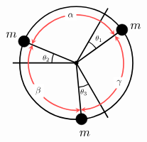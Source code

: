 \documentclass[10pt]{article}
\begin{document}
	$$\begin{tikzpicture}
            \draw[very thick] (0,0) circle (2cm);
            \filldraw[black] (0,0) circle (0.07cm);
            \foreach \position in {(1.618,1.176), (-1.848,0.765), (.185,-1.991)} {
                \filldraw[black] \position circle (0.2cm);
                \draw[very thick] (0,0) -- \position;
            }
            \foreach \position in {(2.1,1.3), (-2.3,1), (0.3,-2.5)} {
                \node[scale=1.25] at \position {$m$};
            }
            \foreach \position in {(1.12,1.94), (-2.25,0), (1.12,-1.94)} {
                \draw[very thick] (0,0) -- \position;
            }
            \foreach \position / \start / \end / \label in {(1.354,0.984)/35/157.5/\alpha, (-1.546,0.64)/157.5/275.29/\beta, (0.154,-1.666)/275.29/395/\gamma} {
                \draw[very thick, red!70,stealth-stealth] \position arc (\start:\end:1.673cm) node[midway,black,fill=white,scale=0.875] {$\label$};
            }
            \foreach \position / \start / \end / \label / \location in {(0.701,0.509)/35/60/\theta_1/above right, (-0.8,0.331)/157.5/180/\theta_2/left, (0.08,-0.862)/275.29/300/\theta_3/below} {
                \draw[thick] \position arc (\start:\end:0.866cm) node[midway,\location,black,scale=0.75] {$\label$};
            }
        \end{tikzpicture}$$
\end{document}
